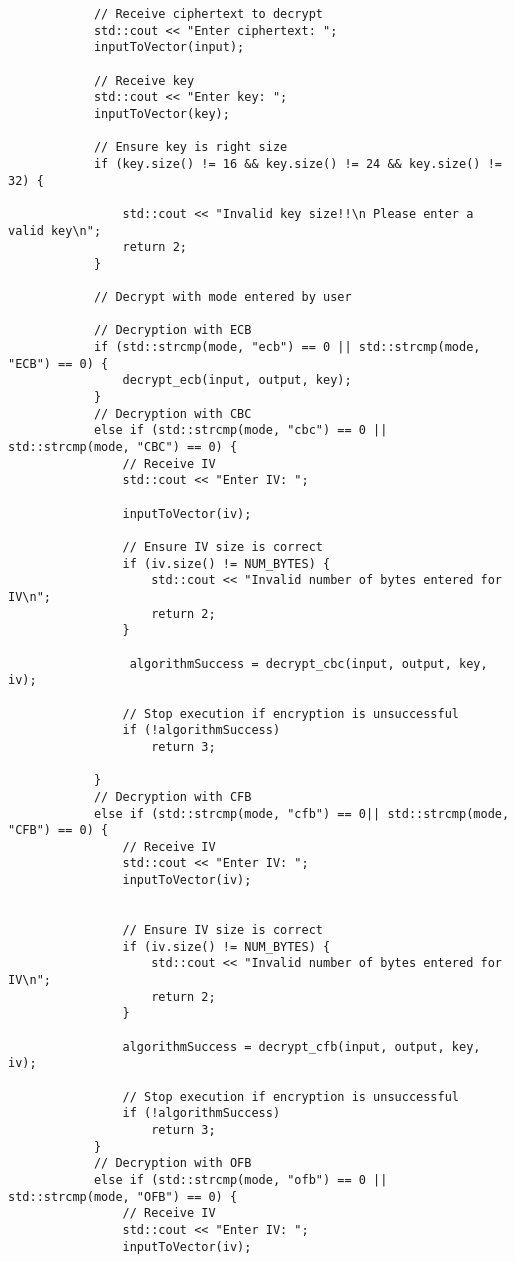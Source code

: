 \documentclass[a4paper,12pt]{article}
\begin{document}
{\begin{lstlisting}
            // Receive ciphertext to decrypt
            std::cout << "Enter ciphertext: ";
            inputToVector(input);

            // Receive key
            std::cout << "Enter key: ";
            inputToVector(key);

            // Ensure key is right size
            if (key.size() != 16 && key.size() != 24 && key.size() != 32) {

                std::cout << "Invalid key size!!\n Please enter a valid key\n";
                return 2;
            }

            // Decrypt with mode entered by user

            // Decryption with ECB
            if (std::strcmp(mode, "ecb") == 0 || std::strcmp(mode, "ECB") == 0) {
                decrypt_ecb(input, output, key);
            }
            // Decryption with CBC
            else if (std::strcmp(mode, "cbc") == 0 || std::strcmp(mode, "CBC") == 0) {
                // Receive IV
                std::cout << "Enter IV: ";

                inputToVector(iv);

                // Ensure IV size is correct
                if (iv.size() != NUM_BYTES) {
                    std::cout << "Invalid number of bytes entered for IV\n";
                    return 2;
                }

                 algorithmSuccess = decrypt_cbc(input, output, key, iv);

                // Stop execution if encryption is unsuccessful
                if (!algorithmSuccess)
                    return 3;

            }
            // Decryption with CFB
            else if (std::strcmp(mode, "cfb") == 0|| std::strcmp(mode, "CFB") == 0) {
                // Receive IV
                std::cout << "Enter IV: ";
                inputToVector(iv);


                // Ensure IV size is correct
                if (iv.size() != NUM_BYTES) {
                    std::cout << "Invalid number of bytes entered for IV\n";
                    return 2;
                }

                algorithmSuccess = decrypt_cfb(input, output, key, iv);

                // Stop execution if encryption is unsuccessful
                if (!algorithmSuccess)
                    return 3;
            }
            // Decryption with OFB
            else if (std::strcmp(mode, "ofb") == 0 || std::strcmp(mode, "OFB") == 0) {
                // Receive IV
                std::cout << "Enter IV: ";
                inputToVector(iv);



\end{lstlisting}}
\end{document}
